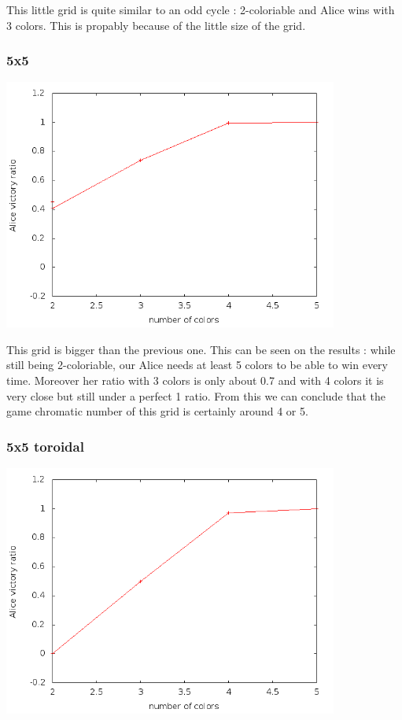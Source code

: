 This little grid is quite similar to an odd cycle : 2-coloriable and Alice wins with 3 colors. This is propably because of the little size of the grid.

\subsubsection{5x5}

\includegraphics[width=11cm]{resultats/grille55.png}

This grid is bigger than the previous one. This can be seen on the results : while still being 2-coloriable, our Alice needs at least 5 colors to be able to win every time. Moreover her ratio with 3 colors is only about 0.7 and with 4 colors it is very close but still under a perfect 1 ratio. From this we can conclude that the game chromatic number of this grid is certainly around 4 or 5.

\subsubsection{5x5 toroidal}

\includegraphics[width=11cm]{resultats/grilletor55.png}

